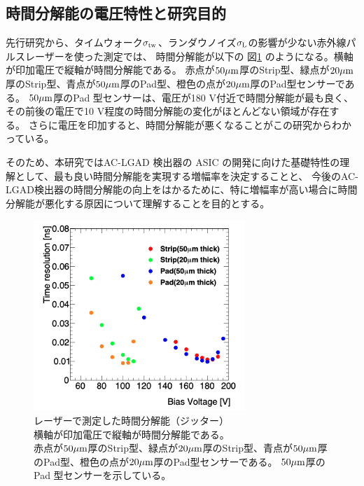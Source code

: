 \subsection{時間分解能の電圧特性と研究目的}
先行研究\cite{Kita_Master}から、タイムウォーク$\sigma_{\rm{tw}}$、ランダウノイズ$\sigma_{\rm{L}}$の影響が少ない赤外線パルスレーザーを使った測定では、
時間分解能が以下の 図\ref{fg:Kita_JittervsVoltage} のようになる。横軸が印加電圧で縦軸が時間分解能である。
赤点が$50 \rm{\mu m}$厚のStrip型、緑点が$20 \rm{\mu m}$厚のStrip型、青点が$50 \rm{\mu m}$厚のPad型、橙色の点が$20 \rm{\mu m}$厚のPad型センサーである。
$50 \rm{\mu m}$厚のPad 型センサーは、電圧が180 V付近で時間分解能が最も良く、その前後の電圧で10 V程度の時間分解能の変化がほとんどない領域が存在する。
さらに電圧を印加すると、時間分解能が悪くなることがこの研究からわかっている。

そのため、本研究ではAC-LGAD 検出器の ASIC の開発に向けた基礎特性の理解として、最も良い時間分解能を実現する増幅率を決定することと、
今後のAC-LGAD検出器の時間分解能の向上をはかるために、特に増幅率が高い場合に時間分解能が悪化する原因について理解することを目的とする。

\begin{figure}[H]
    \centering
    \includegraphics[width=8cm]{fig/ch1/Kita_JittervsVoltage.png}
    \caption[レーザーで測定した時間分解能（ジッター）\cite{Kita_Master}]{レーザーで測定した時間分解能（ジッター）\cite{Kita_Master}\\横軸が印加電圧で縦軸が時間分解能である。\\赤点が$50 \rm{\mu m}$厚のStrip型、緑点が$20 \rm{\mu m}$厚のStrip型、青点が$50 \rm{\mu m}$厚のPad型、橙色の点が$20 \rm{\mu m}$厚のPad型センサーである。
    $50 \rm{\mu m}$厚のPad 型センサーを示している。}
    \label{fg:Kita_JittervsVoltage}
\end{figure}
